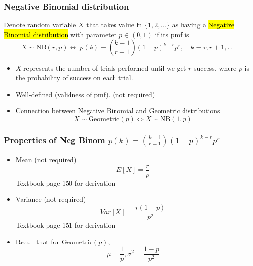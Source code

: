 \documentclass[slidestop,compress,mathserif]{beamer}
\begin{document}
\begin{frame}\frametitle{Negative Binomial distribution}
\begin{defn}
Denote random variable $X$ that takes value in $\{1, 2, \ldots\}$ as having a \hl{Negative Binomial distribution}
 with parameter $p \in (0, 1)$ if its pmf is
\[ X \sim \text{NB}(r, p) \Longleftrightarrow\ p(k) = {k - 1 \choose r - 1}(1-p)^{k-r}p^{r},\quad k = r, r+1, \ldots \]
\end{defn}

\begin{itemize}
\item $X$ represents the number of trials performed until we get $r$ success, where $p$ is the probability of success on each trial.


\item Well-defined (validness of pmf). ({\color{red}not required})



\item Connection between Negative Binomial and Geometric distributions
\[ X \sim \text{Geometric}(p) \Longleftrightarrow  X \sim \text{NB}(1, p) \]


\end{itemize}


\end{frame}

\begin{frame}\frametitle{Properties of Neg Binom $p(k) = {k - 1 \choose r - 1}(1-p)^{k-r}p^{r}$}

\vfill
\begin{itemize}
\item Mean ({\color{red}not required})
\[E[X] = \frac{r}{p} \]
Textbook page 150 for derivation

\item Variance ({\color{red}not required})
\[Var[X] = \frac{r(1-p)}{p^2} \]
Textbook page 151 for derivation

\item Recall that for $\text{Geometric}(p)$,
\[ \mu = \frac{1}{p}, \sigma^2 = \frac{1-p}{p^2}\]


\end{itemize}

\end{frame}
\end{document}
